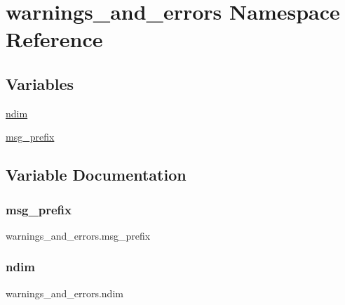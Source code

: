 \hypertarget{namespacewarnings__and__errors}{}\section{warnings\+\_\+and\+\_\+errors Namespace Reference}
\label{namespacewarnings__and__errors}
\subsection*{Variables}
\begin{DoxyCompactItemize}
\item 
\hyperlink{namespacewarnings__and__errors_a8f2c2e2c8cdbb0b0786382a12dcf7f6e}{ndim}
\item 
\hyperlink{namespacewarnings__and__errors_a0634d042b4c5703638ff0274e8f16fc3}{msg\+\_\+prefix}
\end{DoxyCompactItemize}


\subsection{Variable Documentation}
\mbox{\label{namespacewarnings__and__errors_a0634d042b4c5703638ff0274e8f16fc3}} 
\subsubsection{\texorpdfstring{msg\+\_\+prefix}{msg\_prefix}}
{\footnotesize\ttfamily warnings\+\_\+and\+\_\+errors.\+msg\+\_\+prefix}

\mbox{\label{namespacewarnings__and__errors_a8f2c2e2c8cdbb0b0786382a12dcf7f6e}} 
\subsubsection{\texorpdfstring{ndim}{ndim}}
{\footnotesize\ttfamily warnings\+\_\+and\+\_\+errors.\+ndim}

